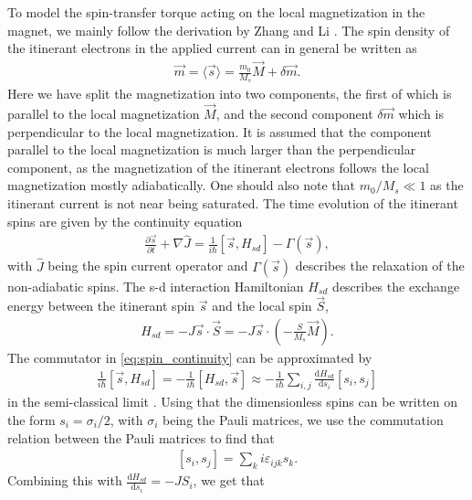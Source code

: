 \documentclass[12pt, a4paper, twoside, openright]{article}		%
\numberwithin{equation}{section}
\begin{document}
To model the spin-transfer torque acting on the local magnetization in the magnet, we mainly follow the derivation by Zhang and Li \cite{ZhangLi-04}. The spin density of the itinerant electrons in the applied current can in general be written as
\begin{align}
\label{eq:mag_current}
\vec{m} = \langle \vec{s} \rangle = \frac{m_0}{M_s}\vec{M} + \delta\vec{m}.
\end{align}
Here we have split the magnetization into two components, the first of which is parallel to the local magnetization $\vec{M}$, and the second component $\delta\vec{m}$ which  is perpendicular to the local magnetization. It is assumed that the component parallel to the local magnetization is much larger than the perpendicular component, as the magnetization of the itinerant electrons follows the local magnetization mostly adiabatically. One should also note that $m_0/M_s \ll 1$ as the itinerant current is not near being saturated. The time evolution of the itinerant spins are given by the continuity equation
\begin{align}
\label{eq:spin_continuity}
\frac{\partial \vec{s}}{\partial t} + \nabla \hat{J} = \frac{1}{i\hbar} \left[ \vec{s}, H_{sd} \right] - \Gamma(\vec{s}),
\end{align}
with $\hat{J}$ being the spin current operator and $\Gamma(\vec{s})$ describes the relaxation of the non-adiabatic spins. The s-d interaction Hamiltonian $H_{sd}$ describes the exchange energy between the itinerant spin $\vec{s}$ and the local spin $\vec{S}$,
\begin{align}
H_{sd} = -J \vec{s} \cdot \vec{S} = -J \vec{s} \cdot (-\frac{S}{M_s} \vec{M}).
\end{align}
The commutator in \eqref{eq:spin_continuity} can be approximated by
\begin{align}
\frac{1}{i\hbar} \left[ \vec{s}, H_{sd} \right] = - \frac{1}{i\hbar} \left[ H_{sd}, \vec{s} \right] \approx -\frac{1}{i\hbar}\sum_{i, j} \frac{\textrm{d} H_{sd}}{\textrm{d} s_i}\left[ s_i, s_j \right]
\end{align}
in the semi-classical limit \citep{kruger2006current}. Using that the dimensionless spins can be written on the form $s_i = \sigma_i/2$, with $\sigma_i$ being the Pauli matrices, we use the commutation relation between the Pauli matrices to find that
\begin{align}
\left[ s_i, s_j \right] = \sum_k i\varepsilon_{ijk} s_k.
\end{align}
Combining this with $\frac{\textrm{d} H_{sd}}{\textrm{d} s_i} = -JS_i$, we get that
\end{document}
